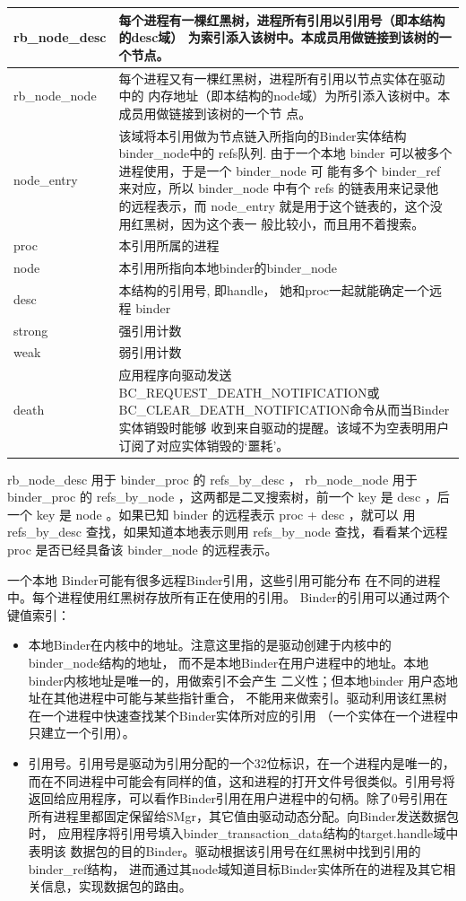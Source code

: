 \documentclass[a4paper,11pt]{article}
\begin{document}
\begin{longtable}{|p{}|p{}|}\hline
    rb_node_desc & 每个进程有一棵红黑树，进程所有引用以引用号（即本结构的desc域）
    为索引添入该树中。本成员用做链接到该树的一个节点。\\\hline
    rb_node_node & 每个进程又有一棵红黑树，进程所有引用以节点实体在驱动中的
    内存地址（即本结构的node域）为所引添入该树中。本成员用做链接到该树的一个节
    点。\\\hline
    node_entry & 该域将本引用做为节点链入所指向的Binder实体结构binder_node中的
    refs队列.  由于一个本地 binder 可以被多个进程使用，于是一个 binder_node 可
    能有多个 binder_ref 来对应，所以 binder_node 中有个 refs 的链表用来记录他
    的远程表示，而 node_entry 就是用于这个链表的，这个没用红黑树，因为这个表一
    般比较小，而且用不着搜索。 \\\hline
    proc & 本引用所属的进程 \\\hline 
    node & 本引用所指向本地binder的binder_node\\\hline
    desc & 本结构的引用号, 即handle， 她和proc一起就能确定一个远程 binder \\\hline
    strong & 强引用计数 \\\hline
    weak & 弱引用计数 \\\hline
    death & 应用程序向驱动发送BC_REQUEST_DEATH_NOTIFICATION或
    BC_CLEAR_DEATH_NOTIFICATION命令从而当Binder实体销毁时能够
    收到来自驱动的提醒。该域不为空表明用户订阅了对应实体销毁的‘噩耗’。\\\hline
\end{longtable}
rb_node_desc 用于 binder_proc 的 refs_by_desc ，
rb_node_node 用于 binder_proc 的 refs_by_node ，这两都是二叉搜索树，前一个 key
是 desc ，后一个 key 是 node 。如果已知 binder 的远程表示 proc + desc ，就可以
用 refs_by_desc 查找，如果知道本地表示则用 refs_by_node 查找，看看某个远程
proc 是否已经具备该 binder_node 的远程表示。 

一个本地 Binder可能有很多远程Binder引用，这些引用可能分布
在不同的进程中。每个进程使用红黑树存放所有正在使用的引用。
Binder的引用可以通过两个键值索引：
\begin{itemize}
\item  本地Binder在内核中的地址。注意这里指的是驱动创建于内核中的binder_node结构的地址，
    而不是本地Binder在用户进程中的地址。本地binder内核地址是唯一的，用做索引不会产生
    二义性；但本地binder 用户态地址在其他进程中可能与某些指针重合，
    不能用来做索引。驱动利用该红黑树在一个进程中快速查找某个Binder实体所对应的引用
    （一个实体在一个进程中只建立一个引用）。
\item 引用号。引用号是驱动为引用分配的一个32位标识，在一个进程内是唯一的，
    而在不同进程中可能会有同样的值，这和进程的打开文件号很类似。引用号将
    返回给应用程序，可以看作Binder引用在用户进程中的句柄。除了0号引用在
    所有进程里都固定保留给SMgr，其它值由驱动动态分配。向Binder发送数据包时，
    应用程序将引用号填入binder_transaction_data结构的target.handle域中表明该
    数据包的目的Binder。驱动根据该引用号在红黑树中找到引用的binder_ref结构，
    进而通过其node域知道目标Binder实体所在的进程及其它相关信息，实现数据包的路由。

\end{itemize}
\end{document}
